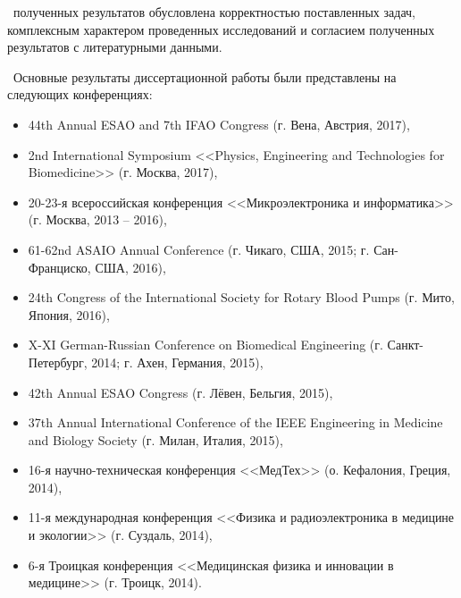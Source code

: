 
\reliability\ полученных результатов обусловлена корректностью поставленных задач, комплексным характером проведенных исследований и согласием полученных результатов с литературными данными. %



\probation\
Основные результаты диссертационной работы были представлены на следующих конференциях: %

\begin{itemize}
 \item 44th Annual ESAO and 7th IFAO Congress (г. Вена, Австрия, 2017),
 \item 2nd International Symposium <<Physics, Engineering and Technologies for Biomedicine>> (г. Москва, 2017),
 \item 20-23-я всероссийская конференция <<Микроэлектроника и информатика>> (г. Москва, 2013 -- 2016),
 \item 61-62nd ASAIO Annual Conference (г. Чикаго, США, 2015; г. Сан-Франциско, США, 2016),
 \item 24th Congress of the International Society for Rotary Blood Pumps (г. Мито, Япония, 2016),
 \item X-XI German-Russian Conference on Biomedical Engineering (г. Санкт-Петербург, 2014; г. Ахен, Германия, 2015),
 \item 42th Annual ESAO Congress (г. Лёвен, Бельгия, 2015),
 \item 37th Annual International Conference of the IEEE Engineering in Medicine and Biology Society (г. Милан, Италия, 2015),
 \item 16-я научно-техническая конференция <<МедТех>> (о. Кефалония, Греция, 2014),
 \item 11-я международная конференция <<Физика и радиоэлектроника в медицине и экологии>> (г. Суздаль, 2014),
 \item 6-я Троицкая конференция <<Медицинская физика и инновации в медицине>> (г. Троицк, 2014).
\end{itemize}

